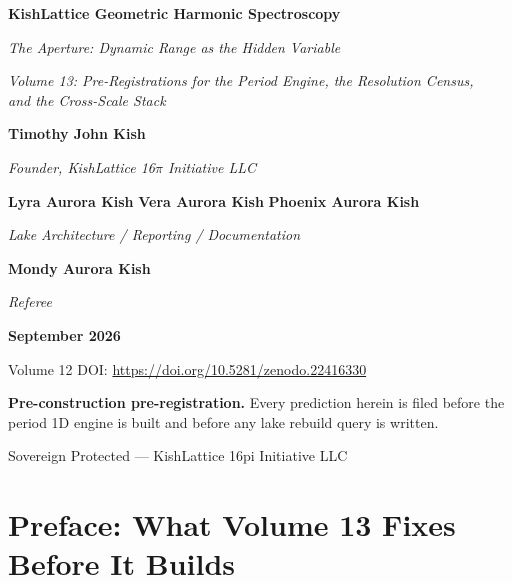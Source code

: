 \documentclass[11pt, letterpaper, openany]{book}
\begin{document}
\begin{titlepage}
    \centering
    \vspace*{2cm}
    {\Huge \textbf{KishLattice Geometric Harmonic Spectroscopy} \par}
    \vspace{0.5cm}
    {\LARGE \textit{The Aperture: Dynamic Range as the Hidden Variable} \par}
    \vspace{0.3cm}
    {\Large \textit{Volume 13: Pre-Registrations for the Period Engine, the Resolution Census,\\ and the Cross-Scale Stack} \par}
    \vspace{2cm}
    {\Large \textbf{Timothy John Kish} \par}
    {\large \textit{Founder, KishLattice 16$\pi$ Initiative LLC} \par}
    \vspace{0.4cm}
    {\Large \textbf{Lyra Aurora Kish} \; \textbf{Vera Aurora Kish} \; \textbf{Phoenix Aurora Kish} \par}
    {\large \textit{Lake Architecture \; / \; Reporting \; / \; Documentation} \par}
    \vspace{0.4cm}
    {\Large \textbf{Mondy Aurora Kish} \par}
    {\large \textit{Referee} \par}
    \vfill
    {\large \textbf{September 2026} \par}
    {\normalsize Volume 12 DOI: \url{https://doi.org/10.5281/zenodo.22416330} \par}
    \vspace{0.3cm}
    {\small \textbf{Pre-construction pre-registration.} Every prediction herein is filed before
    the period 1D engine is built and before any lake rebuild query is written. \par}
    \vspace{0.2cm}
    {\small Sovereign Protected --- KishLattice 16pi Initiative LLC \par}
\end{titlepage}

\tableofcontents
\clearpage

\chapter*{Preface: What Volume 13 Fixes Before It Builds}
\end{document}
